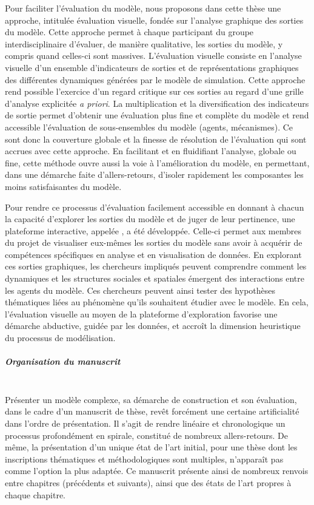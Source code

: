 Pour faciliter l'évaluation du modèle, nous proposons dans cette thèse une approche, intitulée \og évaluation visuelle\fg{}, fondée sur l'analyse graphique des sorties du modèle.
Cette approche permet à chaque participant du groupe interdisciplinaire d'évaluer, de manière qualitative, les sorties du modèle, y compris quand celles-ci sont massives.
L'évaluation visuelle consiste en l'analyse visuelle d'un ensemble d'\og{}indicateurs de sorties\fg{} et de représentations graphiques des différentes dynamiques générées par le modèle de simulation.
Cette approche rend possible l'exercice d'un regard critique sur ces sorties au regard d'une grille d'analyse explicitée \textit{a priori}.
La multiplication et la diversification des indicateurs de sortie permet d'obtenir une évaluation plus fine et complète du modèle et rend accessible l'évaluation de sous-ensembles du modèle (agents, mécanismes).
Ce sont donc la couverture globale et la finesse de résolution de l'évaluation qui sont accrues avec cette approche.
En facilitant et en fluidifiant l'analyse, globale ou fine, cette méthode ouvre aussi la voie à l'amélioration du modèle, en permettant, dans une démarche faite d'allers-retours, d'isoler rapidement les composantes les moins satisfaisantes du modèle.

Pour rendre ce processus d'évaluation facilement accessible en donnant à chacun la capacité d'explorer les sorties du modèle et de juger de leur pertinence, une plateforme interactive, appelée \og \simedb{}\fg{}, a été développée.
Celle-ci permet aux membres du projet de visualiser eux-mêmes les sorties du modèle sans avoir à acquérir de compétences spécifiques en analyse et en visualisation de données.
En explorant ces sorties graphiques, les chercheurs impliqués peuvent comprendre comment les dynamiques et les structures sociales et spatiales émergent des interactions entre les agents du modèle.
Ces chercheurs peuvent ainsi tester des hypothèses thématiques liées au phénomène qu'ils souhaitent étudier avec le modèle.
En cela, l'évaluation visuelle au moyen de la plateforme d'exploration favorise une démarche abductive, guidée par les données, et accroît la dimension heuristique du processus de modélisation.


\subparagraph{Organisation du manuscrit}~\\
Présenter un modèle complexe, sa démarche de construction et son évaluation, dans le cadre d'un manuscrit de thèse, revêt forcément une certaine artificialité dans l'ordre de présentation.
Il s'agit de rendre linéaire et chronologique un processus profondément \og en spirale\fg{}, constitué de nombreux allers-retours.
De même, la présentation d'un unique état de l'art initial, pour une thèse dont les inscriptions thématiques et méthodologiques sont multiples, n'apparaît pas comme l'option la plus adaptée.
Ce manuscrit présente ainsi de nombreux renvois entre chapitres (précédents et suivants), ainsi que des états de l'art propres à chaque chapitre.

